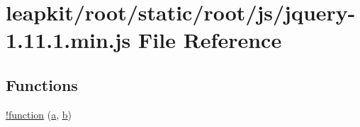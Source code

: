 \hypertarget{root_2static_2root_2js_2jquery-1_811_81_8min_8js}{\section{leapkit/root/static/root/js/jquery-\/1.11.1.min.\-js File Reference}
\label{root_2static_2root_2js_2jquery-1_811_81_8min_8js}
}
\subsection*{Functions}
\begin{DoxyCompactItemize}
\item 
\hyperlink{root_2static_2root_2js_2jquery-1_811_81_8min_8js_a43f0b96ea8ec44ca20ba86809a785614}{!function} (\hyperlink{static_2root_2js_2bootstrap_2bootstrap_8min_8js_a7c466d2f938d0774841daa80edf7b839}{a}, \hyperlink{quill_8min_8js_ae02349c58306210e3fd20abc63482e9a}{b})
\item 

\end{DoxyCompactItemize}
